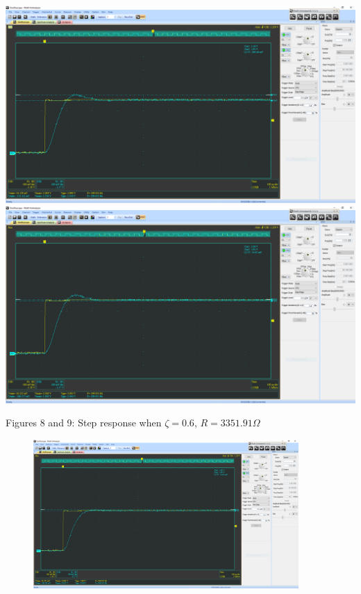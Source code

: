 \documentclass[12pt]{article}
\newcommand{\objects}[2]{%
  \leavevmode\vbox{\hbox{#1}\nointerlineskip\hbox{#2}}%
}
\begin{document}
    \begin{center}
        \objects
            {\includegraphics[width=\textwidth]{4.4 (0.6) 1.png}}
            {\includegraphics[width=\textwidth]{4.4 (0.6) 2.png}}
    \end{center}
    \begin{center}
        Figures 8 and 9: Step response when $ \zeta = 0.6 $, $ R = 3351.91 \Omega $
    \end{center}
    \newpage
    \begin{figure}[h]
        \centering
        \includegraphics[width=0.9\textwidth]{4.4 (0.8).png}
    \end{figure}
\end{document}
